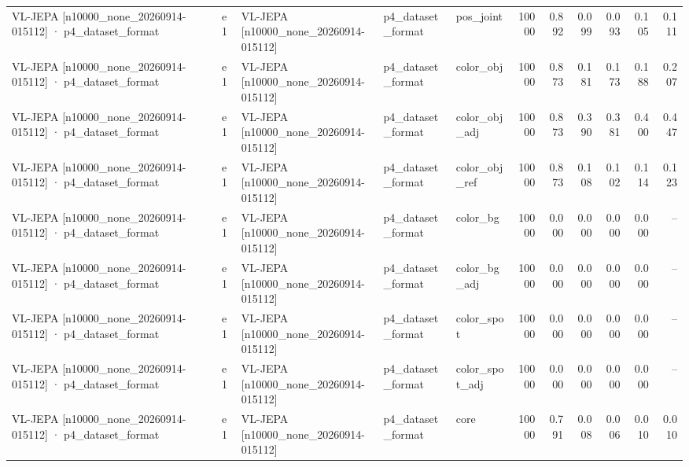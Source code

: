 \begin{tabular}{lllllrrrrrr}
VL-JEPA [n10000\_none\_20260914-015112] · p4\_dataset\_format & e1 & VL-JEPA [n10000\_none\_20260914-015112] & p4\_dataset\_format & pos\_joint & 10000 & 0.892 & 0.099 & 0.093 & 0.105 & 0.111 \\
VL-JEPA [n10000\_none\_20260914-015112] · p4\_dataset\_format & e1 & VL-JEPA [n10000\_none\_20260914-015112] & p4\_dataset\_format & color\_obj & 10000 & 0.873 & 0.181 & 0.173 & 0.188 & 0.207 \\
VL-JEPA [n10000\_none\_20260914-015112] · p4\_dataset\_format & e1 & VL-JEPA [n10000\_none\_20260914-015112] & p4\_dataset\_format & color\_obj\_adj & 10000 & 0.873 & 0.390 & 0.381 & 0.400 & 0.447 \\
VL-JEPA [n10000\_none\_20260914-015112] · p4\_dataset\_format & e1 & VL-JEPA [n10000\_none\_20260914-015112] & p4\_dataset\_format & color\_obj\_ref & 10000 & 0.873 & 0.108 & 0.102 & 0.114 & 0.123 \\
VL-JEPA [n10000\_none\_20260914-015112] · p4\_dataset\_format & e1 & VL-JEPA [n10000\_none\_20260914-015112] & p4\_dataset\_format & color\_bg & 10000 & 0.000 & 0.000 & 0.000 & 0.000 & -- \\
VL-JEPA [n10000\_none\_20260914-015112] · p4\_dataset\_format & e1 & VL-JEPA [n10000\_none\_20260914-015112] & p4\_dataset\_format & color\_bg\_adj & 10000 & 0.000 & 0.000 & 0.000 & 0.000 & -- \\
VL-JEPA [n10000\_none\_20260914-015112] · p4\_dataset\_format & e1 & VL-JEPA [n10000\_none\_20260914-015112] & p4\_dataset\_format & color\_spot & 10000 & 0.000 & 0.000 & 0.000 & 0.000 & -- \\
VL-JEPA [n10000\_none\_20260914-015112] · p4\_dataset\_format & e1 & VL-JEPA [n10000\_none\_20260914-015112] & p4\_dataset\_format & color\_spot\_adj & 10000 & 0.000 & 0.000 & 0.000 & 0.000 & -- \\
VL-JEPA [n10000\_none\_20260914-015112] · p4\_dataset\_format & e1 & VL-JEPA [n10000\_none\_20260914-015112] & p4\_dataset\_format & core & 10000 & 0.791 & 0.008 & 0.006 & 0.010 & 0.010 \\
\bottomrule
\end{tabular}
